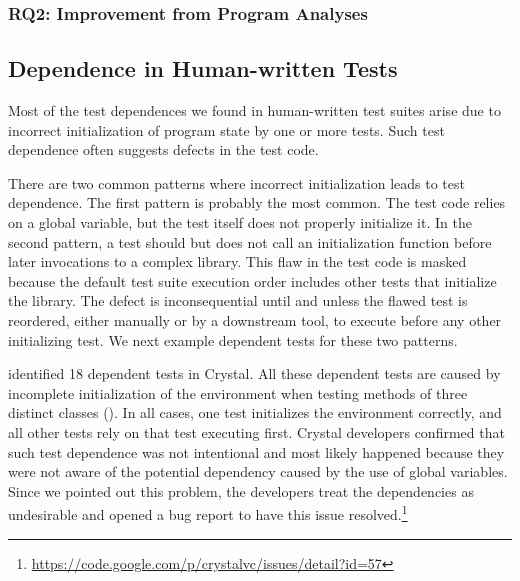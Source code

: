 \subsubsection{RQ2: Improvement from Program Analyses}


\subsection{Dependence in Human-written Tests}
\label{sec:humantest}


Most of the test dependences we found in human-written
test suites arise due to incorrect initialization
of program state by one or more tests. Such test
dependence often suggests defects in the
test code. 

There are two common patterns where incorrect
initialization leads to test dependence.
The first pattern is probably the most common. 
The test code relies on a
global variable, but the test itself does
not properly initialize it.  In the second pattern,
a test should but does not call
an initialization function before later invocations to a complex library.
This flaw in the test code is masked because the default test suite execution
order includes other tests that initialize the library.  The defect is
inconsequential until and unless the flawed test is reordered, either manually or by
a downstream tool, to execute before any other initializing test.
We next example dependent tests for these two patterns.



%
\ourtool identified 18 dependent tests in Crystal.
All these dependent tests
are caused by incomplete initialization of the
environment when testing methods of three distinct classes
().
In all cases, one test initializes the environment correctly, and all
other tests rely on that test executing first. 
Crystal developers confirmed that such test dependence was not
intentional and most likely happened because they were not
aware of the potential dependency caused by the use of global
variables. Since we pointed out this problem, the developers treat the
dependencies as undesirable and opened a bug report to have this issue
resolved.\footnote{\url{https://code.google.com/p/crystalvc/issues/detail?id=57}}


